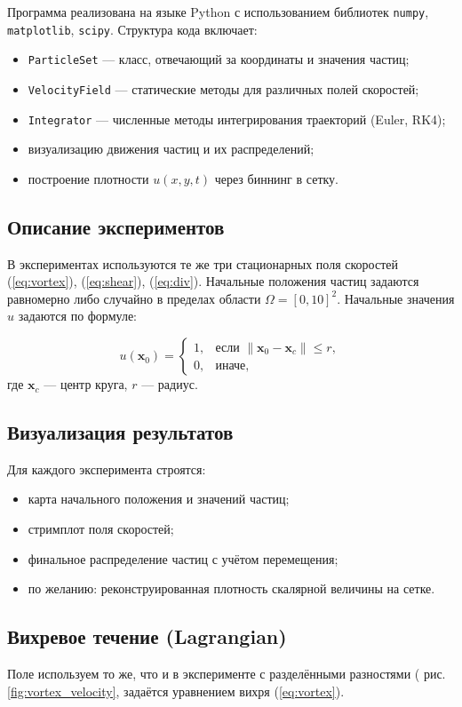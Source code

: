 Программа реализована на языке Python с использованием библиотек \texttt{numpy}, \texttt{matplotlib}, \texttt{scipy}. Структура кода включает:
\begin{itemize}
	\item \texttt{ParticleSet} — класс, отвечающий за координаты и значения частиц;
	\item \texttt{VelocityField} — статические методы для различных полей скоростей;
	\item \texttt{Integrator} — численные методы интегрирования траекторий (Euler, RK4);
	\item визуализацию движения частиц и их распределений;
	\item построение плотности \( u(x, y, t) \) через биннинг в сетку.
\end{itemize}

\subsection{Описание экспериментов}

В экспериментах используются те же три стационарных поля скоростей (\ref{eq:vortex}), (\ref{eq:shear}), (\ref{eq:div}). Начальные положения частиц задаются равномерно либо случайно в пределах области \(\Omega = [0, 10]^2\). Начальные значения \( u \) задаются по формуле:

\[
u(\mathbf{x}_0) =
\begin{cases}
	1, & \text{если } \| \mathbf{x}_0 - \mathbf{x}_c \| \leq r, \\
	0, & \text{иначе},
\end{cases}
\]
где \(\mathbf{x}_c\) — центр круга, \(r\) — радиус.

\subsection{Визуализация результатов}

Для каждого эксперимента строятся:
\begin{itemize}
	\item карта начального положения и значений частиц;
	\item стримплот поля скоростей;
	\item финальное распределение частиц с учётом перемещения;
	\item по желанию: реконструированная плотность скалярной величины на сетке.
\end{itemize}
\newpage
\subsection{Вихревое течение (Lagrangian)}
Поле используем то же, что и в эксперименте с разделёнными разностями ( рис. \ref{fig:vortex_velocity},  задаётся уравнением вихря (\ref{eq:vortex}).

